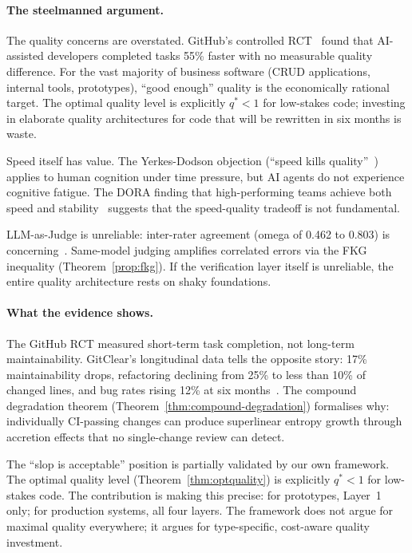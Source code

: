 \documentclass[11pt, a4paper, logo, copyright]{googledeepmind}
\begin{document}
\paragraph{The steelmanned argument.}
The quality concerns are overstated. GitHub's controlled RCT~\citep{github2024rct} found that AI-assisted developers completed tasks 55\% faster with no measurable quality difference. For the vast majority of business software (CRUD applications, internal tools, prototypes), ``good enough'' quality is the economically rational target. The optimal quality level is explicitly $q^* < 1$ for low-stakes code; investing in elaborate quality architectures for code that will be rewritten in six months is waste.

Speed itself has value. The Yerkes-Dodson objection (``speed kills quality''~\citep{yerkes1908relation}) applies to human cognition under time pressure, but AI agents do not experience cognitive fatigue. The DORA finding that high-performing teams achieve both speed and stability~\citep{forsgren2018accelerate} suggests that the speed-quality tradeoff is not fundamental.

LLM-as-Judge is unreliable: inter-rater agreement (omega of 0.462 to 0.803) is concerning~\citep{llmjudgetrust2024}. Same-model judging amplifies correlated errors via the FKG inequality (Theorem~\ref{prop:fkg}). If the verification layer itself is unreliable, the entire quality architecture rests on shaky foundations.

\paragraph{What the evidence shows.}
The GitHub RCT measured short-term task completion, not long-term maintainability. GitClear's longitudinal data tells the opposite story: 17\% maintainability drops, refactoring declining from 25\% to less than 10\% of changed lines, and bug rates rising 12\% at six months~\citep{gitclear2025}. The compound degradation theorem (Theorem~\ref{thm:compound-degradation}) formalises why: individually CI-passing changes can produce superlinear entropy growth through accretion effects that no single-change review can detect.

The ``slop is acceptable'' position is partially validated by our own framework. The optimal quality level (Theorem~\ref{thm:optquality}) is explicitly $q^* < 1$ for low-stakes code. The contribution is making this precise: for prototypes, Layer~1 only; for production systems, all four layers. The framework does not argue for maximal quality everywhere; it argues for type-specific, cost-aware quality investment.
\end{document}
